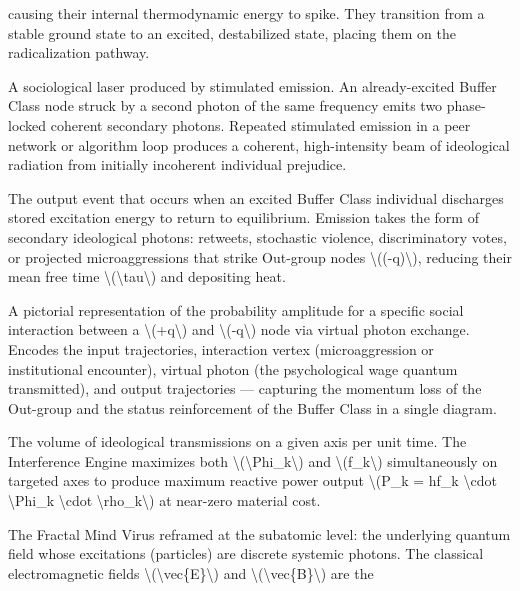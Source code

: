 {\begin{description}
causing their internal thermodynamic energy to spike. They transition
from a stable ground state to an excited, destabilized state, placing
them on the radicalization pathway.
\item[Echo Chamber Laser]
A sociological laser produced by stimulated emission. An already-excited
Buffer Class node struck by a second photon of the same frequency emits
two phase-locked coherent secondary photons. Repeated stimulated
emission in a peer network or algorithm loop produces a coherent,
high-intensity beam of ideological radiation from initially incoherent
individual prejudice.
\item[Emission (Quantum)]
The output event that occurs when an excited Buffer Class individual
discharges stored excitation energy to return to equilibrium. Emission
takes the form of secondary ideological photons: retweets, stochastic
violence, discriminatory votes, or projected microaggressions that
strike Out-group nodes \textbackslash((-q)\textbackslash), reducing
their mean free time \textbackslash(\textbackslash tau\textbackslash)
and depositing heat.
\item[Feynman Diagram (Systemic)]
A pictorial representation of the probability amplitude for a specific
social interaction between a \textbackslash(+q\textbackslash) and
\textbackslash(-q\textbackslash) node via virtual photon exchange.
Encodes the input trajectories, interaction vertex (microaggression or
institutional encounter), virtual photon (the psychological wage quantum
transmitted), and output trajectories --- capturing the momentum loss of
the Out-group and the status reinforcement of the Buffer Class in a
single diagram.
\item[Photon Flux \textbackslash(\textbackslash Phi\textbackslash)]
The volume of ideological transmissions on a given axis per unit time.
The Interference Engine maximizes both
\textbackslash(\textbackslash Phi\_k\textbackslash) and
\textbackslash(f\_k\textbackslash) simultaneously on targeted axes to
produce maximum reactive power output \textbackslash(P\_k = hf\_k
\textbackslash cdot \textbackslash Phi\_k \textbackslash cdot
\textbackslash rho\_k\textbackslash) at near-zero material cost.
\item[Quantum Field (Mind Virus)]
The Fractal Mind Virus reframed at the subatomic level: the underlying
quantum field whose excitations (particles) are discrete systemic
photons. The classical electromagnetic fields
\textbackslash(\textbackslash vec\{E\}\textbackslash) and
\textbackslash(\textbackslash vec\{B\}\textbackslash) are the

\end{description}}
